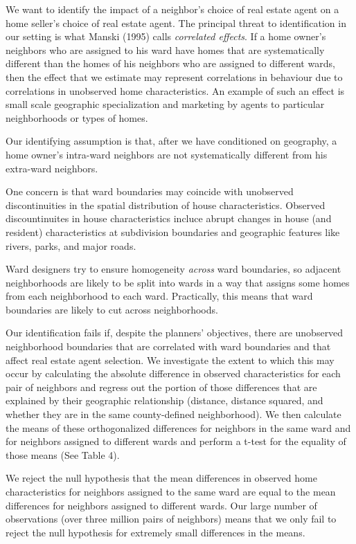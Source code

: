 \documentclass[12pt]{article}
\begin{document}
    We want to identify the impact of a neighbor's choice of real estate agent on a home seller's choice of real estate agent.  The principal threat to
    identification in our setting is what Manski (1995) calls \emph{correlated effects}.  If a home owner's neighbors who are assigned to his ward
    have homes that are
    systematically different than the homes of his neighbors who are assigned to different wards, then the effect that we estimate may represent correlations in
    behaviour due to correlations in unobserved home characteristics.  An example of such an effect is small scale geographic
    specialization and marketing by agents to particular neighborhoods or types of homes.

    Our identifying assumption is that, after we have conditioned on geography, a home owner's intra-ward neighbors are not systematically different
    from his extra-ward neighbors.

    One concern is that ward boundaries may coincide with unobserved discontinuities in the spatial distribution of house characteristics.
    Observed discountinuites in house characteristics incluce abrupt changes in house (and resident) characteristics at subdivision
    boundaries and geographic features like rivers, parks, and major roads.

    Ward designers try to ensure homogeneity \emph{across} ward boundaries, so adjacent neighborhoods are likely to be split into
    wards in a way that assigns some homes from each neighborhood to each ward. Practically, this means that ward boundaries are likely to cut across
    neighborhoods.

    Our identification fails if, despite the planners' objectives, there are unobserved neighborhood boundaries that are correlated with ward
    boundaries and that affect real estate agent
    selection. We investigate the extent to which this may occur by calculating the absolute difference in observed
    characteristics for each pair of neighbors and regress out the portion of those differences that are explained by their geographic relationship
    (distance, distance squared, and whether they are in the same county-defined neighborhood). We then calculate the means of these orthogonalized
    differences for neighbors in the same ward and for neighbors assigned to different wards and perform a t-test for the equality of those means (See
    Table 4).

    We reject the null hypothesis that the mean differences in observed home characteristics for neighbors assigned to the same ward are equal to the
    mean differences for neighbors assigned to different wards. Our large number of observations (over three million pairs of neighbors) means that we only fail to reject the null hypothesis for extremely small differences in the means.
\end{document}
